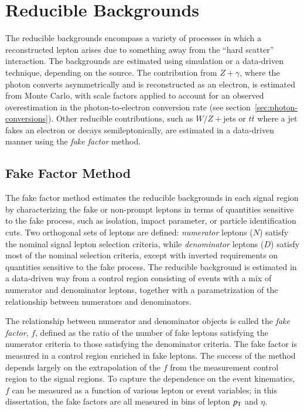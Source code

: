 \section{Reducible Backgrounds}\label{sec:reducible-backgrounds}
The reducible backgrounds encompass a variety of processes in which a reconstructed lepton arises due to something away from the ``hard scatter'' interaction. The backgrounds are estimated using simulation or a data-driven technique, depending on the source. The contribution from $Z+\gamma$, where the photon converts asymmetrically and is reconstructed as an electron, is estimated from Monte Carlo, with scale factors applied to account for an observed overestimation in the photon-to-electron conversion rate (see section~\ref{sec:photon-conversions}). Other reducible contributions, such as $W/Z+$jets or $t\overline{t}$ where a jet fakes an electron or decays semileptonically, are estimated in a data-driven manner using the \emph{fake factor} method. 


\subsection{Fake Factor Method}\label{sec:fake-factor-method}
The fake factor method estimates the reducible backgrounds in each signal region by characterizing the fake or non-prompt leptons in terms of quantities sensitive to the fake process, such as isolation, impact parameter, or particle identification cuts. Two orthogonal sets of leptons are defined: \emph{numerator} leptons ($N$) satisfy the nominal signal lepton selection criteria, while \emph{denominator} leptons ($D$) satisfy most of the nominal selection criteria, except with inverted requirements on quantities sensitive to the fake process. The reducible background is estimated in a data-driven way from a control region consisting of events with a mix of numerator and denominator leptons, together with a parametrization of the relationship between numerators and denominators. 

The relationship between numerator and denominator objects is called the \emph{fake factor}, $f$, defined as the ratio of the number of fake leptons satisfying the numerator criteria to those satisfying the denominator criteria. The fake factor is measured in a control region enriched in fake leptons. The success of the method depends largely on the extrapolation of the $f$ from the measurement control region to the signal regions. To capture the dependence on the event kinematics, $f$ can be measured as a function of various lepton or event variables; in this dissertation, the fake factors are all measured in bins of lepton $p_{\text{T}}$ and $\eta$. 

